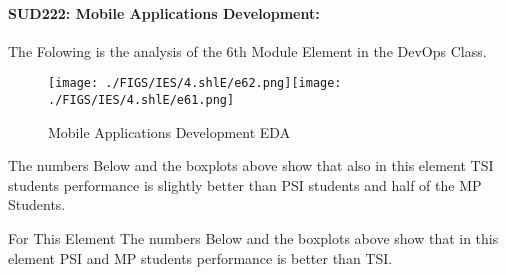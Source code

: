\documentclass[12pt]{extreport}
\begin{document}

\paragraph{\large SUD222: Mobile Applications Development:\\
}  
The Folowing is the analysis of the 6th Module Element in the DevOps Class.

\begin{figure}[H]
	\centering
	\texttt{[image: ./FIGS/IES/4.shlE/e62.png]}\texttt{[image: ./FIGS/IES/4.shlE/e61.png]}
	\caption{Mobile Applications Development EDA}
	\label{fig:49}
\end{figure}

The numbers Below and the boxplots above show that also in this element  TSI students performance is slightly better than PSI students and half of the MP Students.

For This Element The numbers Below and the boxplots above show that in this element  PSI and MP students performance is  better than TSI.
\end{document}
